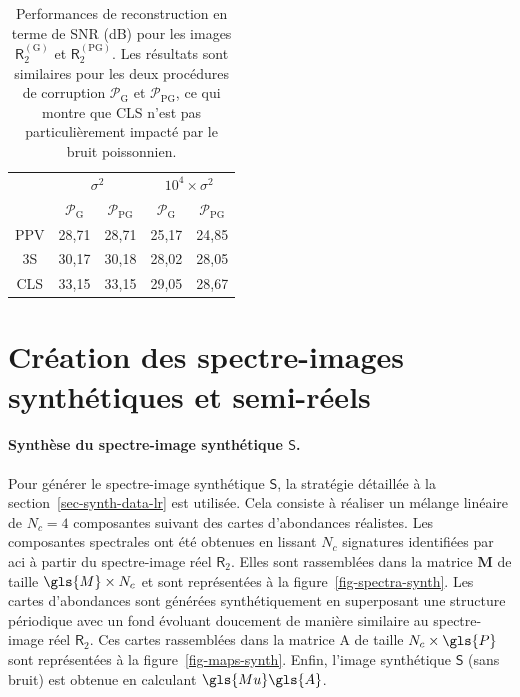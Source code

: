 \begin{table}[t]
    \centering
    \begin{tabular}{ccc|cc}
        \toprule
        & \multicolumn{2}{c|}{$\sigma^2$} & \multicolumn{2}{c}{$10^4\times\sigma^2$}\\
        & $\mathcal{P}_{\mathrm{G}}$ & $\mathcal{P}_{\mathrm{PG}}$ & $\mathcal{P}_{\mathrm{G}}$ & $\mathcal{P}_{\mathrm{PG}}$\\
        \midrule
        PPV     & 28,71    & 28,71              & 25,17    & 24,85 \\
        3S     & 30,17    & 30,18              & 28,02    & 28,05 \\
        CLS    & 33,15    & 33,15              & 29,05    & 28,67 \\
        \bottomrule
    \end{tabular}
    \caption{Performances de reconstruction en terme de SNR (dB) pour les images $\mathsf{R}_2^{(\mathrm{G})}$ et $\mathsf{R}_2^{(\mathrm{PG})}$. Les résultats sont similaires pour les deux procédures de corruption $\mathcal{P}_{\mathrm{G}}$ et $\mathcal{P}_{\mathrm{PG}}$, ce qui montre que CLS n'est pas particulièrement impacté par le bruit poissonnien.
        \protect\label{table:SNR-poisson-gaussian}}
\end{table}


\section{Création des spectre-images synthétiques et semi-réels}\label{sec-spim-creation-hr}

\paragraph{Synthèse du spectre-image synthétique $\mathsf{S}$.} Pour générer le spectre-image synthétique $\mathsf{S}$, la stratégie détaillée à la section~\ref{sec-synth-data-lr} est utilisée. Cela consiste à réaliser un mélange linéaire de $N_c=4$ composantes suivant des cartes d'abondances réalistes. Les composantes spectrales ont été obtenues en lissant $N_c$ signatures identifiées par \gls{aci} à partir du spectre-image réel $\mathsf{R}_2$. Elles sont rassemblées dans la matrice $\mathbf{M}$ de taille $\gls{M}\times N_c$ et sont représentées à la figure~\ref{fig-spectra-synth}. Les cartes d'abondances sont générées synthétiquement en superposant une structure périodique avec un fond évoluant doucement de manière similaire au spectre-image réel $\mathsf{R}_2$. Ces cartes rassemblées dans la matrice \gls{A} de taille $N_c\times\gls{P}$ sont représentées à la figure~\ref{fig-maps-synth}. Enfin, l'image synthétique $\mathsf{S}$ (sans bruit) est obtenue en calculant $\gls{Mu}\gls{A}$.

